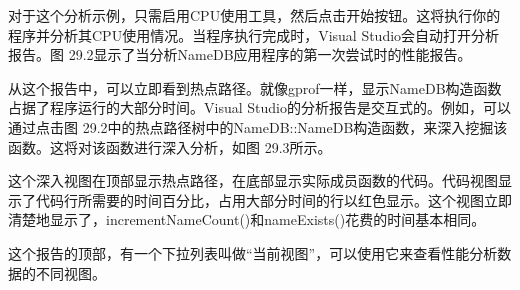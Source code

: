 对于这个分析示例，只需启用CPU使用工具，然后点击开始按钮。这将执行你的程序并分析其CPU使用情况。当程序执行完成时，Visual Studio会自动打开分析报告。图 29.2显示了当分析NameDB应用程序的第一次尝试时的性能报告。


从这个报告中，可以立即看到热点路径。就像gprof一样，显示NameDB构造函数占据了程序运行的大部分时间。Visual Studio的分析报告是交互式的。例如，可以通过点击图 29.2中的热点路径树中的NameDB::NameDB构造函数，来深入挖掘该函数。这将对该函数进行深入分析，如图 29.3所示。


这个深入视图在顶部显示热点路径，在底部显示实际成员函数的代码。代码视图显示了代码行所需要的时间百分比，占用大部分时间的行以红色显示。这个视图立即清楚地显示了，incrementNameCount()和nameExists()花费的时间基本相同。

这个报告的顶部，有一个下拉列表叫做“当前视图”，可以使用它来查看性能分析数据的不同视图。






